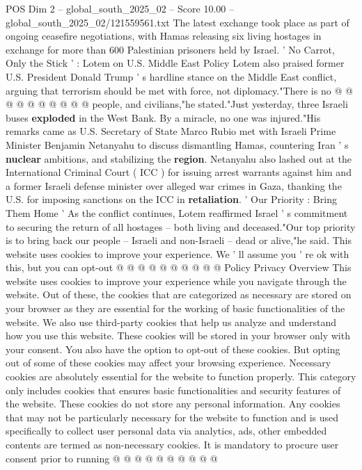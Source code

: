 \begin{textsample}{POS Dim 2 – global\_south\_2025\_02 – Score 10.00 – global\_south\_2025\_02/121559561.txt}
The latest exchange took place as part of ongoing ceasefire negotiations, with Hamas releasing six living hostages in exchange for more than 600 Palestinian prisoners held by Israel. ' No Carrot, Only the Stick ' : Lotem on U.S.
Middle East Policy Lotem also praised former U.S.
President Donald Trump ' s hardline stance on the Middle East conflict, arguing that terrorism should be met with force, not diplomacy."There is no @ @ @ @ @ @ @ @ @ @ people, and civilians,"he stated."Just yesterday, three Israeli buses \textbf{exploded} in the West Bank.
By a miracle, no one was injured."His remarks came as U.S.
Secretary of State Marco Rubio met with Israeli Prime Minister Benjamin Netanyahu to discuss dismantling Hamas, countering Iran ' s \textbf{nuclear} ambitions, and stabilizing the \textbf{region}.
Netanyahu also lashed out at the International Criminal Court ( ICC ) for issuing arrest warrants against him and a former Israeli defense minister over alleged war crimes in Gaza, thanking the U.S. for imposing sanctions on the ICC in \textbf{retaliation}. ' Our Priority : Bring Them Home ' As the conflict continues, Lotem reaffirmed Israel ' s commitment to securing the return of all hostages -- both living and deceased."Our top priority is to bring back our people -- Israeli and non-Israeli -- dead or alive,"he said.
This website uses cookies to improve your experience.
We ' ll assume you ' re ok with this, but you can opt-out @ @ @ @ @ @ @ @ @ @ Policy Privacy Overview This website uses cookies to improve your experience while you navigate through the website.
Out of these, the cookies that are categorized as necessary are stored on your browser as they are essential for the working of basic functionalities of the website.
We also use third-party cookies that help us analyze and understand how you use this website.
These cookies will be stored in your browser only with your consent.
You also have the option to opt-out of these cookies.
But opting out of some of these cookies may affect your browsing experience.
Necessary cookies are absolutely essential for the website to function properly.
This category only includes cookies that ensures basic functionalities and security features of the website.
These cookies do not store any personal information.
Any cookies that may not be particularly necessary for the website to function and is used specifically to collect user personal data via analytics, ads, other embedded contents are termed as non-necessary cookies.
It is mandatory to procure user consent prior to running @ @ @ @ @ @ @ @ @ @

\end{textsample}
